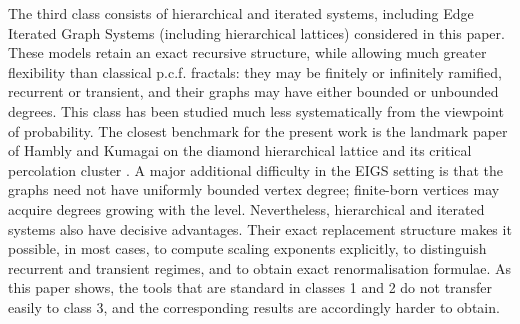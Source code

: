 \documentclass{article}
\theoremstyle{plain}
\theoremstyle{definition}
\begin{document}
The third class consists of hierarchical and iterated systems, including Edge Iterated Graph Systems (including hierarchical lattices) considered in this paper. 
These models retain an exact recursive structure, while allowing much greater flexibility than classical p.c.f. fractals: they may be finitely or infinitely ramified, recurrent or transient, and their graphs may have either bounded or unbounded degrees. 
This class has been studied much less systematically from the viewpoint of probability. 
The closest benchmark for the present work is the landmark paper of Hambly and Kumagai on the diamond hierarchical lattice and its critical percolation cluster \cite{hambly2010diffusion}. 
A major additional difficulty in the EIGS setting is that the graphs need not have uniformly bounded vertex degree; finite-born vertices may acquire degrees growing with the level. 
Nevertheless, hierarchical and iterated systems also have decisive advantages. 
Their exact replacement structure makes it possible, in most cases, to compute scaling exponents explicitly, to distinguish recurrent and transient regimes, and to obtain exact renormalisation formulae. 
As this paper shows, the tools that are standard in classes 1 and 2 do not transfer easily to class 3, and the corresponding results are accordingly harder to obtain.




\end{document}

